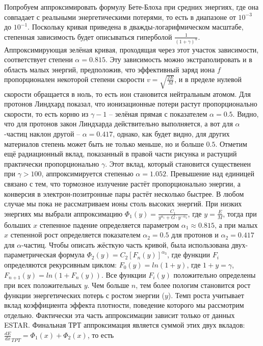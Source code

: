 \documentclass[a4paper,12pt]{article}
\begin{document}
\begin{large}
  Попробуем аппроксимировать формулу Бете-Блоха при средних энергиях, где она совпадает с реальными энергетическими потерями, то есть в диапазоне от $10^{-3}$ до $10^{-1}$.
  Поскольку кривая приведена в дважды-логарифмическом масштабе, степенная зависимость будет описываться гиперболой $\frac{1}{(1+\gamma)^\alpha}$.
  Аппроксимирующая зелёная кривая, проходящая через этот участок зависимости, соответствует степени $\alpha=0.815$.
  Эту зависимость можно экстраполировать и в область малых энергий, предположив, что эффективный заряд иона $f$ пропорционален некоторой степени скорости $v=\sqrt{\frac{2E}{M}}$, и в пределе нулевой скорости обращается в ноль, то есть ион становится нейтральным атомом.
  Для протонов Линдхард показал, что ионизационные потери растут пропорционально скорости, то есть корню из $\gamma-1$ -- зелёная прямая с показателем $\alpha=0.5$.
  Видно, что для протонов закон Линдхарда действительно выполняется, а вот для $\alpha$-частиц наклон другой -- $\alpha=0.417$, однако, как будет видно, для других материалов степень может быть не только меньше, но и больше $0.5$.
  Отметим ещё радиационный вклад, показанный в правой части рисунка и растущий практически пропорционально $\gamma$.
  Этот вклад, который становится существенен при $\gamma > 100$, аппроксимируется степенью $\alpha=1.052$.
  Превышение над единицей связано с тем, что тормозное излучение растёт пропорционально энергии, а конверсия в электрон-позитронные пары растёт несколько быстрее.
  В любом случае мы пока не рассматриваем ионы столь высоких энергий.
  При низких энергиях мы выбрали аппроксимацию $\Phi_1(y)=\frac{C_1}{y^{\alpha_1}+G\cdot y^{-\alpha_2}}$, где $y=\frac{E}{M}$, тогда при больших $x$ степенное падение определяется параметром $\alpha_1\approx 0.815$, а при малых $x$ степенной рост определяется показателем $\alpha_2=0.5$ для протонов и $\alpha_2=0.417$ для $\alpha$-частиц.
  Чтобы описать жёсткую часть кривой, была использована двух-параметрическая формула $\Phi_2(y)=C_2 [F_n(y)]^{\alpha_3}$, где функции $F_i$ определяются рекурсивным циклом: $F_0(y)=ln(1+y)$, где $1+y=\gamma$, $F_{n+1}(y)=ln(1+F_n(y))$.
  Все функции $F_i(y)$ положительно определены при всех положительных $y$.
  Чем больше $n$, тем более пологим становится рост функции энергетических потерь с ростом энергии ($y$).
  Темп роста учитывает вклад коэффициента эффекта плотности, поведение которого мы рассмотрим отдельно.
  Фактически эта часть аппроксимации зависит только от данных ESTAR.
  Финальная ТРТ аппроксимация является суммой этих двух вкладов: $\frac{dE}{dx}_{TPT}=\Phi_1(x)+\Phi_2(x)$, то есть

\end{large}
\end{document}
